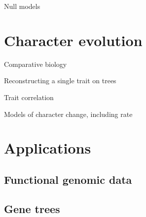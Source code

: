 \documentclass[
]{book}
\begin{document}
Null models

\hypertarget{character-evolution}{%
\chapter{Character evolution}\label{character-evolution}}

Comparative biology

Reconstructing a single trait on trees

Trait correlation

Models of character change, including rate

\hypertarget{applications}{%
\chapter{Applications}\label{applications}}

\hypertarget{functional-genomic-data}{%
\section{Functional genomic data}\label{functional-genomic-data}}

\hypertarget{gene-trees}{%
\section{Gene trees}\label{gene-trees}}

  
\end{document}
